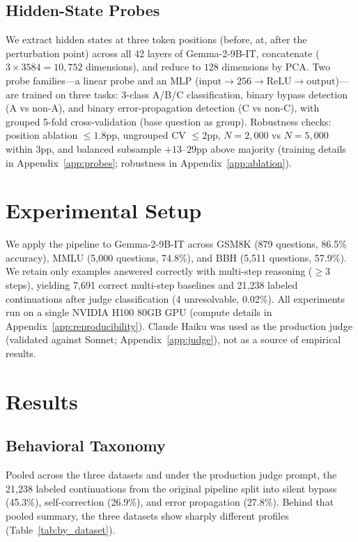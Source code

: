 \documentclass[10pt]{article} %
\begin{document}
\subsection{Hidden-State Probes}
\label{sec:probes}

We extract hidden states at three token positions (before, at, after the perturbation point) across all 42 layers of Gemma-2-9B-IT, concatenate ($3 \times 3584 = 10{,}752$ dimensions), and reduce to $128$ dimensions by PCA. Two probe families---a linear probe and an MLP ($\text{input}\to 256\to\text{ReLU}\to\text{output}$)---are trained on three tasks: 3-class A/B/C classification, binary bypass detection (A vs non-A), and binary error-propagation detection (C vs non-C), with grouped 5-fold cross-validation (base question as group). Robustness checks: position ablation $\leq 1.8$pp, ungrouped CV $\leq 2$pp, $N = 2{,}000$ vs $N = 5{,}000$ within $3$pp, and balanced subsample $+13$--$29$pp above majority (training details in Appendix~\ref{app:probes}; robustness in Appendix~\ref{app:ablation}).


\section{Experimental Setup}
\label{sec:setup}

We apply the pipeline to Gemma-2-9B-IT across GSM8K (879 questions, 86.5\% accuracy), MMLU (5,000 questions, 74.8\%), and BBH (5,511 questions, 57.9\%). We retain only examples answered correctly with multi-step reasoning ($\geq$3 steps), yielding 7,691 correct multi-step baselines and 21,238 labeled continuations after judge classification (4 unresolvable, 0.02\%). All experiments run on a single NVIDIA H100 80GB GPU (compute details in Appendix~\ref{app:reproducibility}). Claude Haiku was used as the production judge (validated against Sonnet; Appendix~\ref{app:judge}), not as a source of empirical results.


\section{Results}

\subsection{Behavioral Taxonomy}
\label{sec:behavioral}

Pooled across the three datasets and under the production judge prompt, the 21{,}238 labeled continuations from the original pipeline split into silent bypass (45.3\%), self-correction (26.9\%), and error propagation (27.8\%). Behind that pooled summary, the three datasets show sharply different profiles (Table~\ref{tab:by_dataset}).
\end{document}
